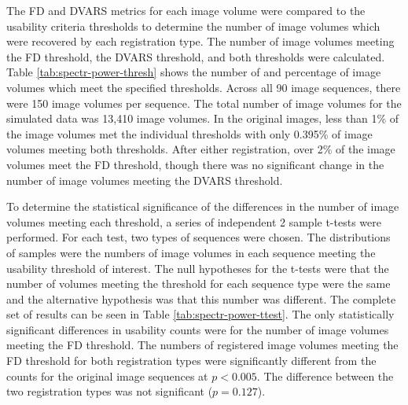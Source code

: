The FD and DVARS metrics for each image volume were compared to the usability criteria thresholds to determine the number of image volumes which were recovered by each registration type. The number of image volumes meeting the FD threshold, the DVARS threshold, and both thresholds were calculated. Table \ref{tab:spectr-power-thresh} shows the number of and percentage of image volumes which meet the specified thresholds. Across all 90 image sequences, there were 150 image volumes per sequence. The total number of image volumes for the simulated data was 13,410 image volumes. In the original images, less than 1\% of the image volumes met the individual thresholds with only 0.395\% of image volumes meeting both thresholds. After either registration, over 2\% of the image volumes meet the FD threshold, though there was no significant change in the number of image volumes meeting the DVARS threshold.

To determine the statistical significance of the differences in the number of image volumes meeting each threshold, a series of independent 2 sample t-tests were performed. For each test, two types of sequences were chosen. The distributions of samples were the numbers of image volumes in each sequence meeting the usability threshold of interest. The null hypotheses for the t-tests were that the number of volumes meeting the threshold for each sequence type were the same and the alternative hypothesis was that this number was different. The complete set of results can be seen in Table \ref{tab:spectr-power-ttest}. The only statistically significant differences in usability counts were for the number of image volumes meeting the FD threshold. The numbers of registered image volumes meeting the FD threshold for both registration types were significantly different from the counts for the original image sequences at $p < 0.005$. The difference between the two registration types was not significant ($p = 0.127$).


